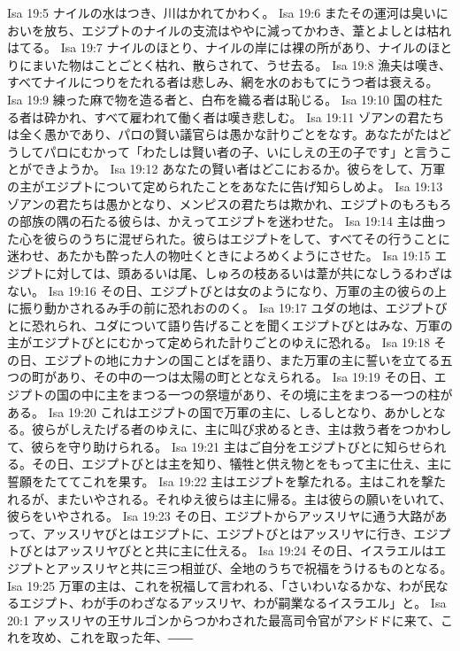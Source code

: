 Isa 19:5  ナイルの水はつき、川はかれてかわく。
Isa 19:6  またその運河は臭いにおいを放ち、エジプトのナイルの支流はややに減ってかわき、葦とよしとは枯れはてる。
Isa 19:7  ナイルのほとり、ナイルの岸には裸の所があり、ナイルのほとりにまいた物はことごとく枯れ、散らされて、うせ去る。
Isa 19:8  漁夫は嘆き、すべてナイルにつりをたれる者は悲しみ、網を水のおもてにうつ者は衰える。
Isa 19:9  練った麻で物を造る者と、白布を織る者は恥じる。
Isa 19:10  国の柱たる者は砕かれ、すべて雇われて働く者は嘆き悲しむ。
Isa 19:11  ゾアンの君たちは全く愚かであり、パロの賢い議官らは愚かな計りごとをなす。あなたがたはどうしてパロにむかって「わたしは賢い者の子、いにしえの王の子です」と言うことができようか。
Isa 19:12  あなたの賢い者はどこにおるか。彼らをして、万軍の主がエジプトについて定められたことをあなたに告げ知らしめよ。
Isa 19:13  ゾアンの君たちは愚かとなり、メンピスの君たちは欺かれ、エジプトのもろもろの部族の隅の石たる彼らは、かえってエジプトを迷わせた。
Isa 19:14  主は曲った心を彼らのうちに混ぜられた。彼らはエジプトをして、すべてその行うことに迷わせ、あたかも酔った人の物吐くときによろめくようにさせた。
Isa 19:15  エジプトに対しては、頭あるいは尾、しゅろの枝あるいは葦が共になしうるわざはない。
Isa 19:16  その日、エジプトびとは女のようになり、万軍の主の彼らの上に振り動かされるみ手の前に恐れおののく。
Isa 19:17  ユダの地は、エジプトびとに恐れられ、ユダについて語り告げることを聞くエジプトびとはみな、万軍の主がエジプトびとにむかって定められた計りごとのゆえに恐れる。
Isa 19:18  その日、エジプトの地にカナンの国ことばを語り、また万軍の主に誓いを立てる五つの町があり、その中の一つは太陽の町ととなえられる。
Isa 19:19  その日、エジプトの国の中に主をまつる一つの祭壇があり、その境に主をまつる一つの柱がある。
Isa 19:20  これはエジプトの国で万軍の主に、しるしとなり、あかしとなる。彼らがしえたげる者のゆえに、主に叫び求めるとき、主は救う者をつかわして、彼らを守り助けられる。
Isa 19:21  主はご自分をエジプトびとに知らせられる。その日、エジプトびとは主を知り、犠牲と供え物とをもって主に仕え、主に誓願をたててこれを果す。
Isa 19:22  主はエジプトを撃たれる。主はこれを撃たれるが、またいやされる。それゆえ彼らは主に帰る。主は彼らの願いをいれて、彼らをいやされる。
Isa 19:23  その日、エジプトからアッスリヤに通う大路があって、アッスリヤびとはエジプトに、エジプトびとはアッスリヤに行き、エジプトびとはアッスリヤびとと共に主に仕える。
Isa 19:24  その日、イスラエルはエジプトとアッスリヤと共に三つ相並び、全地のうちで祝福をうけるものとなる。
Isa 19:25  万軍の主は、これを祝福して言われる、「さいわいなるかな、わが民なるエジプト、わが手のわざなるアッスリヤ、わが嗣業なるイスラエル」と。
Isa 20:1  アッスリヤの王サルゴンからつかわされた最高司令官がアシドドに来て、これを攻め、これを取った年、――
